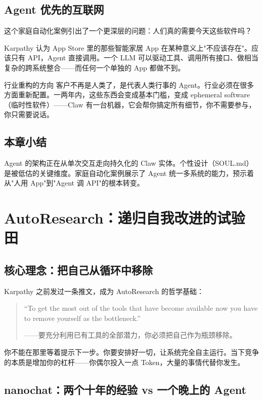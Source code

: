 \documentclass[a4paper]{article}
\begin{document}
\subsection{Agent 优先的互联网}

这个家庭自动化案例引出了一个更深层的问题：人们真的需要今天这些软件吗？

Karpathy 认为 App Store 里的那些智能家居 App 在某种意义上"不应该存在"。应该只有 API，Agent 直接调用。一个 LLM 可以驱动工具、调用所有接口、做相当复杂的跨系统整合——而任何一个单独的 App 都做不到。

\begin{importantbox}{行业重构的方向}
客户不再是人类了，是代表人类行事的 Agent。行业必须在很多方面重新配置。一两年内，这些东西会变成基本门槛，变成 ephemeral software（临时性软件）——Claw 有一台机器，它会帮你搞定所有细节，你不需要参与，你只需要说话。
\end{importantbox}

\subsection{本章小结}

Agent 的架构正在从单次交互走向持久化的 Claw 实体。个性设计（SOUL.md）是被低估的关键维度。家庭自动化案例展示了 Agent 统一多系统的能力，预示着从"人用 App"到"Agent 调 API"的根本转变。


\section{AutoResearch：递归自我改进的试验田}

\subsection{核心理念：把自己从循环中移除}

Karpathy 之前发过一条推文，成为 AutoResearch 的哲学基础：

\begin{quote}
``To get the most out of the tools that have become available now you have to remove yourself as the bottleneck.''

——要充分利用已有工具的全部潜力，你必须把自己作为瓶颈移除。
\end{quote}

你不能在那里等着提示下一步。你要安排好一切，让系统完全自主运行。当下竞争的本质是增加你的杠杆——你偶尔投入一点 Token，大量的事情代替你发生。

\subsection{nanochat：两个十年的经验 vs 一个晚上的 Agent}
\end{document}
